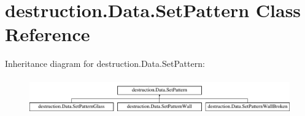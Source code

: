 \hypertarget{classdestruction_1_1_data_1_1_set_pattern}{\section{destruction.\-Data.\-Set\-Pattern Class Reference}
\label{classdestruction_1_1_data_1_1_set_pattern}
}
Inheritance diagram for destruction.\-Data.\-Set\-Pattern\-:\begin{figure}[H]
\begin{center}
\leavevmode
\includegraphics[height=1.568627cm]{classdestruction_1_1_data_1_1_set_pattern}
\end{center}
\end{figure}
